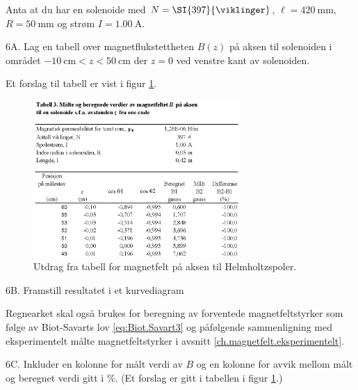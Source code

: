 \documentclass[../Elmag-labhefte-2020.tex]{subfiles}
\begin{document}
Anta at du har en solenoide med  $N = \SI{397}{\viklinger}$, $\ell = \SI{420}{\mm}$, $R = \SI{50}{\mm}$ og strøm $I = \SI{1,00}{\ampere}$.

{\itsf 6A. Lag en tabell over magnetflukstettheten $B(z)$ på aksen til solenoiden i området $\SI{-10}{\cm} < z < \SI{50}{\cm}$ der $z = 0$ ved venstre kant av solenoiden.} %


Et forslag til tabell er vist i figur \ref{magnetfelt.tab3}. 
%
\begin{figure}[ht]
    \begin{center}
    \includegraphics[width=0.7\textwidth]{fig/magnetfelt-tab3.eps}
    \end{center}
    \caption{%
        Utdrag fra tabell for magnetfelt på aksen til Helmholtzspoler.
    }
    \label{magnetfelt.tab3}
\end{figure}

{\itsf 6B. Framstill resultatet i et kurvediagram}

Regnearket skal også brukes for beregning av forventede magnetfeltstyrker som følge av Biot-Savarts lov \eqref{eq:Biot.Savart3}  og påfølgende sammenligning med eksperimentelt målte magnetfeltstyrker i avsnitt \ref{ch.magnetfelt.eksperimentelt}.

{\itsf 6C. Inkluder en kolonne for målt verdi av $B$ og en kolonne for avvik mellom målt og beregnet verdi gitt i \si{\percent}}. (Et forslag er gitt i tabellen i figur \ref{magnetfelt.tab3}.)
\end{document}
